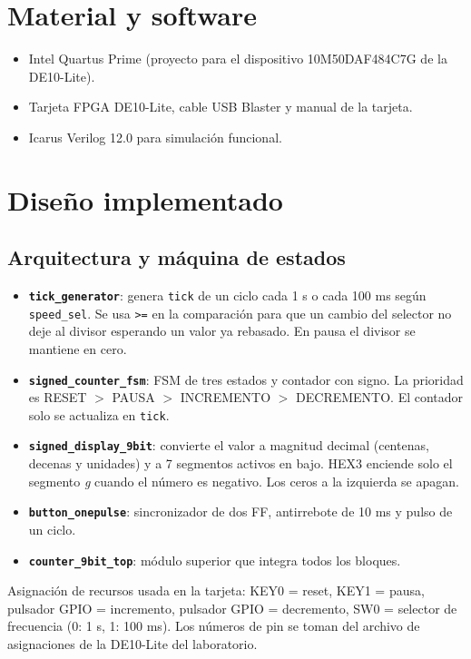\documentclass[11pt,a4paper]{article}
\begin{document}
\section{Material y software}
\begin{itemize}
  \item Intel Quartus Prime (proyecto para el dispositivo 10M50DAF484C7G de la DE10-Lite).
  \item Tarjeta FPGA DE10-Lite, cable USB Blaster y manual de la tarjeta.
  \item Icarus Verilog 12.0 para simulaci\'on funcional.
\end{itemize}

\section{Dise\~no implementado}
\subsection{Arquitectura y m\'aquina de estados}
\begin{itemize}
  \item \textbf{\texttt{tick\_generator}}: genera \texttt{tick} de un ciclo cada 1 s o cada 100 ms seg\'un \texttt{speed\_sel}. Se usa \texttt{>=} en la comparaci\'on para que un cambio del selector no deje al divisor esperando un valor ya rebasado. En pausa el divisor se mantiene en cero.
  \item \textbf{\texttt{signed\_counter\_fsm}}: FSM de tres estados y contador con signo. La prioridad es RESET $>$ PAUSA $>$ INCREMENTO $>$ DECREMENTO. El contador solo se actualiza en \texttt{tick}.
  \item \textbf{\texttt{signed\_display\_9bit}}: convierte el valor a magnitud decimal (centenas, decenas y unidades) y a 7 segmentos activos en bajo. HEX3 enciende solo el segmento \emph{g} cuando el n\'umero es negativo. Los ceros a la izquierda se apagan.
  \item \textbf{\texttt{button\_onepulse}}: sincronizador de dos FF, antirrebote de 10 ms y pulso de un ciclo.
  \item \textbf{\texttt{counter\_9bit\_top}}: m\'odulo superior que integra todos los bloques.
\end{itemize}

Asignaci\'on de recursos usada en la tarjeta: KEY0 = reset, KEY1 = pausa, pulsador GPIO = incremento, pulsador GPIO = decremento, SW0 = selector de frecuencia (0: 1 s, 1: 100 ms). Los n\'umeros de pin se toman del archivo de asignaciones de la DE10-Lite del laboratorio.
\end{document}
